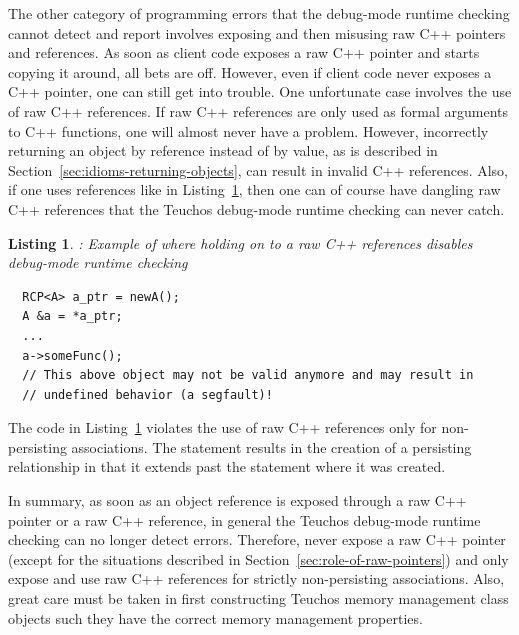 \documentclass[pdf,ps2pdf,11pt]{SANDreport}
\newtheorem{listing}{Listing}
\begin{document}

The other category of programming errors that the debug-mode runtime
checking cannot detect and report involves exposing and then misusing
raw C++ pointers and references.  As soon as client code exposes a raw
C++ pointer and starts copying it around, all bets are off.  However,
even if client code never exposes a C++ pointer, one can still get
into trouble.  One unfortunate case involves the use of raw C++
references.  If raw C++ references are only used as formal arguments
to C++ functions, one will almost never have a problem.  However,
incorrectly returning an {} object by reference instead of by
value, as is described in Section~\ref{sec:idioms-returning-objects},
can result in invalid C++ references.  Also, if one uses references
like in Listing~\ref{listing:raw-ref-dangling-ref}, then one can of
course have dangling raw C++ references that the Teuchos debug-mode
runtime checking can never catch.

{}\begin{listing}: Example of where holding on to a raw C++ references
disables debug-mode runtime checking
\label{listing:raw-ref-dangling-ref}
{\small\begin{verbatim}
  RCP<A> a_ptr = newA();
  A &a = *a_ptr;
  ...
  a->someFunc();
  // This above object may not be valid anymore and may result in
  // undefined behavior (a segfault)!
\end{verbatim}}
\end{listing}

The code in Listing~\ref{listing:raw-ref-dangling-ref} violates the
use of raw C++ references only for non-persisting associations.  The
statement {} results in the creation of a
persisting relationship in that it extends past the statement where it
was created.

In summary, as soon as an object reference is exposed through a raw
C++ pointer or a raw C++ reference, in general the Teuchos debug-mode
runtime checking can no longer detect errors.  Therefore, never expose
a raw C++ pointer (except for the situations described in
Section~\ref{sec:role-of-raw-pointers}) and only expose and use raw
C++ references for strictly non-persisting associations.  Also, great
care must be taken in first constructing Teuchos memory management
class objects such they have the correct memory management properties.
\end{document}
